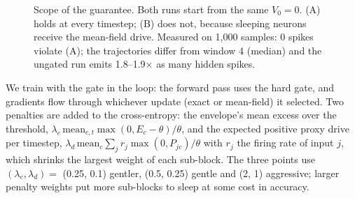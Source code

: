 \documentclass[conference]{IEEEtran}
\begin{document}
\begin{figure}[t]\centering
{}
\caption{Scope of the guarantee. Both runs start from the same $V_0=0$. (A) holds at every timestep; (B) does not,
because sleeping neurons receive the mean-field drive. Measured on 1,000 samples: 0 spikes violate (A); the
trajectories differ from window 4 (median) and the ungated run emits 1.8--1.9$\times$ as many hidden spikes.}
\label{fig:scope}\end{figure} We train with the gate in the loop: the
forward pass uses the hard gate, and gradients flow through whichever update (exact or mean-field) it selected. Two
penalties are added to the cross-entropy: the envelope's mean excess over the
threshold, $\lambda_e\,\mathrm{mean}_{c,t}\max(0,E_c-\theta)/\theta$, and the expected positive proxy drive per
timestep, $\lambda_d\,\mathrm{mean}_c\sum_j r_j\max(0,P_{jc})/\theta$ with $r_j$ the firing rate of input $j$,
which shrinks the largest weight of each sub-block. The three points use $(\lambda_e,\lambda_d)=$ (0.25, 0.1)
gentler, (0.5, 0.25) gentle and (2, 1) aggressive; larger penalty weights put more sub-blocks to sleep at some cost in
accuracy.
\end{document}
